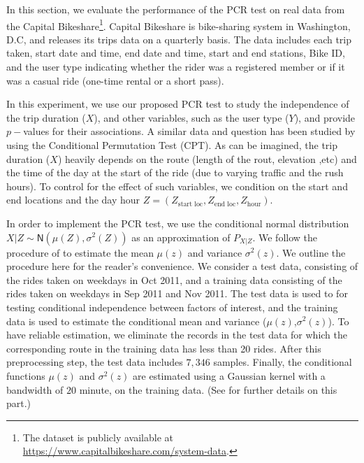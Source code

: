 \documentclass[11pt]{article}
\def\normal{\mathsf{N}}
\begin{document}
In this section, we evaluate the performance of the PCR test on real data from the Capital Bikeshare\footnote{The dataset is publicly available at \url{https://www.capitalbikeshare.com/system-data}.}. Capital Bikeshare is bike-sharing system in Washington, D.C, and releases its trips data on a quarterly basis. The data includes each trip taken, start date and time, end date and time,
start and end stations, Bike ID, and the  user type indicating whether the rider was a registered member or if it was a casual ride (one-time rental or a short pass). 

In this experiment, we use our proposed PCR test to study the independence of the trip duration ($X$), and other variables, such as the user type ($Y$), and provide $p-$values for their associations. A similar data and question has been studied by \cite{berrett2020conditional} using the Conditional Permutation Test (CPT). As can be imagined, the trip duration ($X$) heavily depends on the route (length of the rout, elevation ,etc) and the time of the day at the start of the ride (due to varying traffic and the rush hours). To control for the effect of such variables, we condition on the start and end locations and the day hour $Z=(Z_{\text{start loc}}, Z_{\text{end loc}}, Z_{\text{hour}})$. 

In order to implement the PCR test, we use the conditional normal distribution $X|Z \sim \normal(\mu(Z), \sigma^2(Z))$ as an approximation of $P_{X|Z}$.  We follow the procedure of \cite{berrett2020conditional} to estimate the mean $\mu(z)$ and variance $\sigma^2(z)$. We outline the procedure here for the reader's convenience. We consider a test data, consisting of the rides taken on weekdays in Oct 2011, and a training data consisting of the rides taken on weekdays in Sep 2011 and Nov 2011. The test data is used to for testing conditional independence between factors of interest, and the training data is used to estimate the conditional mean and variance ($\mu(z)$,$\sigma^2(z)$). To have reliable estimation, we eliminate the records in the test data for which the corresponding route in the training data has less than 20 rides. After this preprocessing step, the test data includes $7,346$ samples. Finally, the conditional functions $\mu(z)$ and $\sigma^2(z)$ are estimated using a Gaussian kernel with a bandwidth of $20$ minute, on the training data. (See \cite[Appendix B]{berrett2020conditional}for further details on this part.) 
\end{document}
